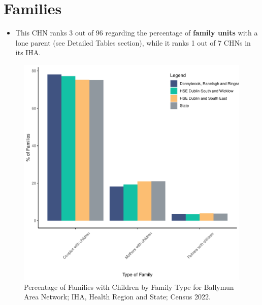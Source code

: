 \documentclass{article}
\begin{document}
\section{Families}\label{sect:Fam}
\begin{itemize}
\item This CHN ranks  3 out of 96 regarding the percentage of \textbf{family units} with a lone parent (see Detailed Tables section), while it ranks   1 out of 7 CHNs in its IHA.
\end{itemize}
\begin{figure}[H]
	\centering
	\includegraphics[width = 150mm]{../figures/FamED.pdf}
	\caption{Percentage of Families with Children by Family Type for Ballymun Area Network; IHA, Health Region and State; Census 2022.}
	\label{fig:vbnv}
	\end{figure}
	
\end{document}
